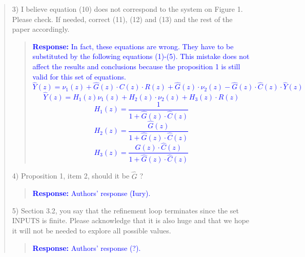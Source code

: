 \documentclass[11pt]{article}
\begin{document}
\begin{quote}
3) I believe equation (10) does not correspond to the system on Figure 1. Please check. If needed, correct (11), (12) and (13) and the rest of the paper accordingly.
\begin{quote}
\textcolor{blue}{\textbf{Response:}
In fact, these equations are wrong. They have to be substituted by the following equations (1)-(5). This mistake does not affect the results and conclusions because the proposition 1 is still valid for this set of equations.
\begin{equation}
\hat{Y}(z)=\nu_{1}(z)+\hat{G}(z)\cdot C(z)\cdot R(z)+\hat{G}(z)\cdot\nu_{2}(z)-\hat{G}(z)\cdot \hat{C}(z)\cdot \hat{Y}(z)
\end{equation}
%
\begin{equation}
\hat{Y}(z)=H_{1}(z)\nu_{1}(z)+H_{2}(z)\cdot\nu_{2}(z)+H_{3}(z)\cdot R(z)
\end{equation}
%
\begin{equation}
H_{1}(z)=\frac{1}{1+\hat{G}(z)\cdot \hat{C}(z)}
\end{equation}
\begin{equation}
H_{2}(z)=\frac{\hat{G}(z)}{1+\hat{G}(z)\cdot \hat{C}(z)}
\end{equation}
\begin{equation}
H_{3}(z)=\frac{\hat{G}(z)\cdot \hat{C}(z)}{1+\hat{G}(z)\cdot \hat{C}(z)}
\end{equation}
}
\end{quote}


4) Proposition 1, item 2, should it be $\hat G$ ?
\begin{quote}
\textcolor{blue}{\textbf{Response:} Authors' response (Iury).}
\end{quote}

5) Section 3.2, you say that the refinement loop terminates since the set INPUTS is finite. Please acknowledge that it is also huge and that we hope it will not be needed to explore all possible values.
\begin{quote}
\textcolor{blue}{\textbf{Response:} Authors' response (?).}
\end{quote}



\end{quote}
\end{document}
